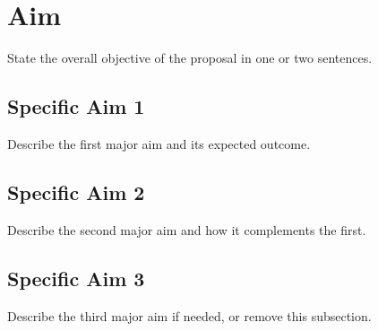 \section{Aim}

State the overall objective of the proposal in one or two sentences.

\subsection{Specific Aim 1}

Describe the first major aim and its expected outcome.

\subsection{Specific Aim 2}

Describe the second major aim and how it complements the first.

\subsection{Specific Aim 3}

Describe the third major aim if needed, or remove this subsection.
